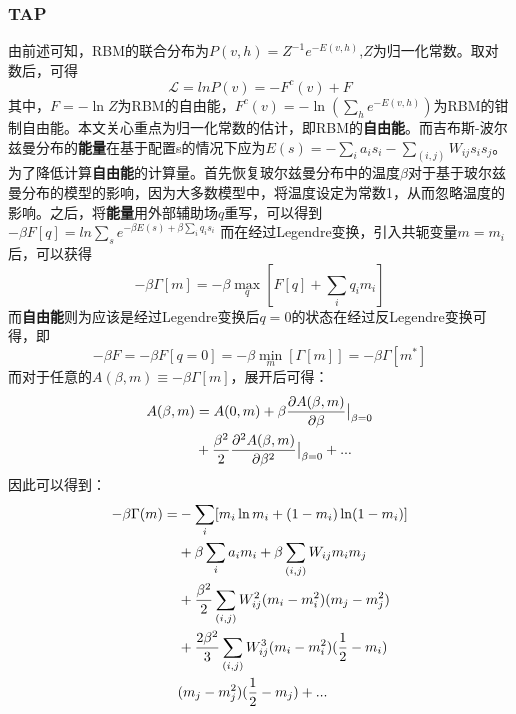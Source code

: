 \documentclass[journal,a4paper]{IEEEtran}
\begin{document}
	\subsubsection{TAP\cite{gabrie2015training}}
		由前述可知，RBM的联合分布为$P(v,h)=Z^{-1}e^{-E(v,h)}$,$Z$为归一化常数。取对数后，可得
		\begin{equation}
			\mathcal{L} = lnP(v) = - F^c(v)+F
		\end{equation}
		其中，$F = -\ln Z$为RBM的自由能，$F^c(v)= -\ln(\sum_he^{-E(v,h)})$为RBM的钳制自由能。本文关心重点为归一化常数的估计，即RBM的\textbf{自由能}。而吉布斯-波尔兹曼分布的\textbf{能量}在基于配置s的情况下应为$E(s) = -\sum_ia_is_i-\sum_{(i,j)}W_{ij}s_is_j$。
		为了降低计算\textbf{自由能}的计算量。首先恢复玻尔兹曼分布中的温度$\beta$对于基于玻尔兹曼分布的模型的影响，因为大多数模型中，将温度设定为常数1，从而忽略温度的影响。之后，将\textbf{能量}用外部辅助场$q$重写，可以得到$-\beta F[q] = ln \sum_se^{-\beta E(s)+ \beta\sum_iq_is_i} $ 而在经过Legendre变换，引入共轭变量$ m  = {m_i}$后，可以获得
		\begin{equation}
		 -\beta \Gamma[m]= -\beta \max_q[F[q]+\sum_iq_im_i]
		\end{equation}
		而\textbf{自由能}则为应该是经过Legendre变换后$q=0$的状态在经过反Legendre变换可得，即
		\begin{equation}
		 -\beta F= -\beta F[q=0] = -\beta \min_m[ \Gamma[m]] = -\beta  \Gamma[m^*]
		\end{equation}
		而对于任意的$A(\beta,m) \equiv -\beta\Gamma[m] $，展开后可得：
		\begin{align}
		A(\beta,m) & = A(0,m) + \beta \frac{\partial A(\beta,m)}{\partial\beta}\big|_{\beta=0} \notag \\
		& + \frac{\beta^2}{2}\frac{\partial^2A(\beta,m)}{\partial\beta^2}\big|_{\beta=0} + ...
		\end{align}
		因此可以得到：
		\begin{align}
		-\beta\Gamma(m)= &-\sum_i[m_i\ln m_i + (1-m_i)\ln(1-m_i)] \notag \\
		& +\beta \sum_i a_im_i + \beta \sum_{(i,j)} W_{ij}m_im_j \notag \\
		& +\frac{\beta^2}{2} \sum_{(i,j)} W_{ij}^2(m_i-m_i^2)(m_j -m_j^2) \notag \\
		& +\frac{2\beta^2}{3} \sum_{(i,j)} W_{ij}^3(m_i-m_i^2)(\frac{1}{2}-m_i) \notag \\
		& (m_j -m_j^2)(\frac{1}{2}-m_j) + ...
		\end{align}
\end{document}
